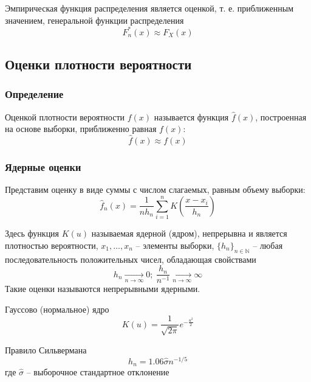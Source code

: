 \documentclass[12pt]{article}
\begin{document}
	Эмпирическая функция распределения является оценкой, т. е. приближенным значением, генеральной функции распределения
	\begin{equation}
		F^*_n(x)\approx F_X(x)
	\end{equation}

	\subsection{Оценки плотности вероятности}
	
	\subsubsection{Определение}
	
	Оценкой плотности вероятности $f(x)$ называется функция $\widehat{f}(x)$, построенная на основе выборки, приближенно равная $f(x)$:
	\begin{equation}
		\widehat{f}(x) \approx f(x)
	\end{equation}

	\subsubsection{Ядерные оценки}
	
	Представим оценку в виде суммы с числом слагаемых, равным объему выборки:
	\begin{equation}
		\widehat{f}_n(x) = \dfrac{1}{nh_n}\sum\limits_{i=1}^nK\left(\dfrac{x-x_i}{h_n}\right)
	\end{equation}

	Здесь функция $K(u)$ называемая ядерной (ядром), непрерывна и является
	плотностью вероятности, $x_1,\dots,x_n$ -- элементы выборки, $\{h_n\}_{n\in\mathbb{N}}$ -- любая последовательность положительных чисел, обладающая свойствами
	\begin{equation}
		h_n \xrightarrow[n\rightarrow\infty]{} 0;\ \dfrac{h_n}{n^{-1}}\xrightarrow[n\rightarrow\infty]{}\infty
	\end{equation}
	Такие оценки называются непрерывными ядерными.
	
	Гауссово (нормальное) ядро
	\begin{equation}
		K(u) = \dfrac{1}{\sqrt{2\pi}}e^{-\frac{u^2}{2}}
	\end{equation}
	
	Правило Сильвермана
	\begin{equation}
		h_n = 1.06\hat{\sigma}n^{-1/5}
	\end{equation}
	где $\hat{\sigma}$ -- выборочное стандартное отклонение
	
\end{document}
